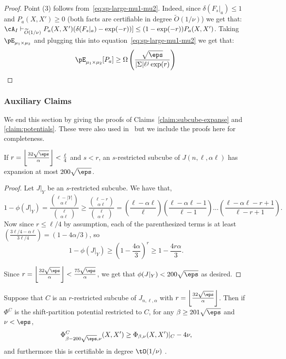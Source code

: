 \begin{proof}
Point (3) follows from~\eqref{eq:sp-large-mu1-mu2}. Indeed, 
since $\delta(F_s|_a) \leq 1$ and $P_a(X,X') \geq 0$ (both facts are certifiable in degree $\widetilde{O}(1/\nu)$) we get that: $\cA_I \vdash_{\widetilde{O}(1/\nu)} P_{a}(X,X')(\delta(F_s|_a)-\exp(-r))] \leq (1-\exp(-r))P_a(X,X')$. Taking $\pE_{\mu_1 \times \mu_2}$ and plugging this into equation~\eqref{eq:sp-large-mu1-mu2} we get that:
\[\pE_{\mu_1 \times \mu_2}[P_a] \geq \Omega\left(\frac{\sqrt{\eps}}{|\Sigma|\ell^{j}\exp(r)}\right)
\qedhere\]
\end{proof}


\subsubsection{Auxiliary Claims}\label{sec:aux_claims}
We end this section by giving the proofs of Claims~\ref{claim:subcube-expanse} and \ref{claim:potentials}. These were also used in~\cite{BBKSS} but we include the proofs here for completeness.


\begin{claim}\label{claim:subcube-expanse}
If $r = \left\lfloor\frac{32\sqrt{\eps}}{\alpha}\right\rfloor < \frac{\ell}{4}$ and $s < r$, an $s$-restricted subcube of $J(n,\ell,\alpha\ell)$ has expansion at most $200\sqrt{\eps}$.
\end{claim}


\begin{proof}
Let $J|_Y$ be an $s$-restricted subcube.
We have that,
\[1 - \phi(J|_Y) = \frac{\binom{\ell - |Y|}{\alpha\ell}}{\binom{\ell}{\alpha\ell}} \geq \frac{\binom{\ell - r}{\alpha\ell}}{\binom{\ell}{\alpha\ell}} = \left(\frac{\ell - \alpha\ell}{\ell}\right)\left(\frac{\ell - \alpha\ell - 1}{\ell - 1}\right)\ldots \left(\frac{\ell - \alpha\ell - r + 1}{\ell - r + 1}\right).\]
Now since $r \leq \ell/4$ by assumption, each of the parenthesized terms is at least $\left(\frac{3\ell/4 - \alpha\ell}{3\ell/4}\right) = (1 - 4\alpha/3)$, so
\[1 - \phi(J|_Y) \geq \left(1-\frac{4\alpha}{3}\right)^r \geq 1 - \frac{4r\alpha}{3}.\]

Since $r = \left\lfloor\frac{32\sqrt{\eps}}{\alpha}\right\rfloor < \frac{75\sqrt{\eps}}{\alpha}$, we get that $\phi(J|_Y) < 200\sqrt{\eps}$
as desired.
\end{proof}


\begin{claim}\label{claim:potentials}
Suppose that $C$ is an $r$-restricted subcube of $J_{n,\ell,\alpha}$ with $r = \left\lfloor\frac{32\sqrt{\eps}}{\alpha}\right\rfloor$.
Then if $\Phi^C$ is the shift-partition potential restricted to $C$, for any $\beta \ge 201\sqrt{\eps}$ and $\nu < \eps$,
\[
\Phi^C_{\beta -200\sqrt{\eps},\nu}(X,X') \ge \Phi_{\beta,\nu}(X,X')|_C - 4\nu,
\]
and furthermore this is certifiable in degree $\tO(1/\nu)$ \sos.
\end{claim}


